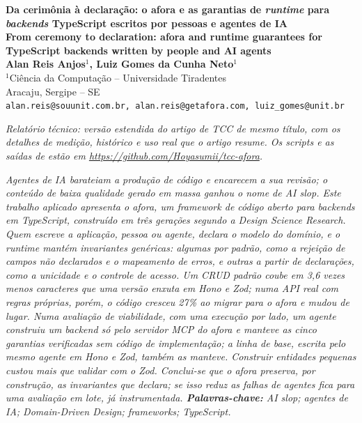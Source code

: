 \documentclass[a4paper,12pt]{article}
\newenvironment{resumo}{%
  \list{}{\advance\topsep by6pt\relax
    \leftmargin=0.8cm
    \labelwidth=0pt
    \listparindent=0pt
    \itemindent\listparindent
    \rightmargin\leftmargin}\item[\hskip\labelsep\bfseries\itshape Resumo.]\itshape}%
  {\endlist}
\begin{document}
\pagestyle{empty}

\begin{center}
  {\fontsize{16}{20}\selectfont\bfseries Da cerimônia à declaração: o afora e as garantias de \textit{runtime} para \textit{backends} TypeScript escritos por pessoas e agentes de IA}\\[4pt]
  {\fontsize{14}{18}\selectfont\bfseries From ceremony to declaration: afora and runtime guarantees for TypeScript backends written by people and AI agents}\\[12pt]

  {\normalsize\bfseries Alan Reis Anjos$^{1}$, Luiz Gomes da Cunha Neto$^{1}$}\\[6pt]

  {\normalsize
    $^{1}$Ciência da Computação -- Universidade Tiradentes\\{}
    Aracaju, Sergipe -- SE\\{}
    \footnotesize\texttt{alan.reis@souunit.com.br, alan.reis@getafora.com, luiz\_gomes@unit.br}
  }
\end{center}
\vspace{6pt}
{\centering\footnotesize\itshape Relatório técnico: versão estendida do artigo de TCC de mesmo título, com os detalhes de medição, histórico e uso real que o artigo resume. Os \textit{scripts} e as saídas de  estão em \url{https://github.com/Hoyasumii/tcc-afora}.\par}
\vspace{6pt}

\begin{resumo}
Agentes de IA barateiam a produção de código e encarecem a sua revisão; o conteúdo de baixa qualidade gerado em massa ganhou o nome de \textit{AI slop}. Este trabalho aplicado apresenta o afora, um \textit{framework} de código aberto para \textit{backends} em TypeScript, construído em três gerações segundo a Design Science Research. Quem escreve a aplicação, pessoa ou agente, declara o modelo do domínio, e o \textit{runtime} mantém invariantes genéricas: algumas por padrão, como a rejeição de campos não declarados e o mapeamento de erros, e outras a partir de declarações, como a unicidade e o controle de acesso. Um CRUD padrão coube em 3,6 vezes menos caracteres que uma versão enxuta em Hono e Zod; numa API real com regras próprias, porém, o código cresceu 27\% ao migrar para o afora e mudou de lugar. Numa avaliação de viabilidade, com uma execução por lado, um agente construiu um \textit{backend} só pelo servidor MCP do afora e manteve as cinco garantias verificadas sem código de implementação; a linha de base, escrita pelo mesmo agente em Hono e Zod, também as manteve. Construir entidades pequenas custou mais que validar com o Zod. Conclui-se que o afora preserva, por construção, as invariantes que declara; se isso reduz as falhas de agentes fica para uma avaliação em lote, já instrumentada.
\end{resumo}
\noindent\textbf{Palavras-chave:} \textit{AI slop}; agentes de IA; Domain-Driven Design; \textit{frameworks}; TypeScript.
\end{document}
